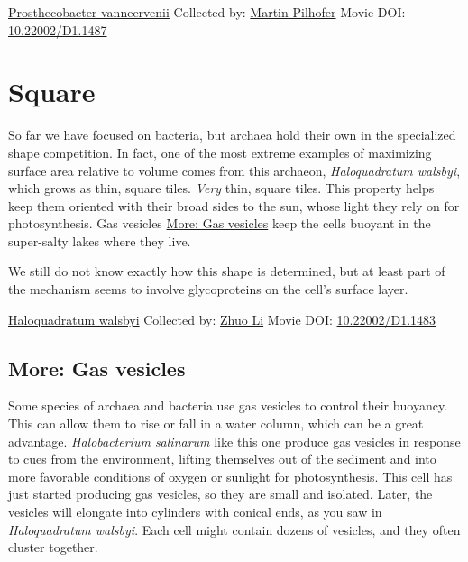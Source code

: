 \documentclass[]{tufte-book}
\begin{document}
\hypertarget{htmlwidget-46dfcbfe86e98af2c6a7}{}

\label{fig:3-6a}\protect\hyperlink{tree}{Prosthecobacter vanneervenii} Collected by: \protect\hyperlink{martin_pilhofer}{Martin Pilhofer} Movie DOI: \href{https://doi.org/10.22002/D1.1487}{10.22002/D1.1487}

\hypertarget{square}{%
\section{Square}\label{square}}

So far we have focused on bacteria, but archaea hold their own in the specialized shape competition. In fact, one of the most extreme examples of maximizing surface area relative to volume comes from this archaeon, \emph{Haloquadratum walsbyi}, which grows as thin, square tiles. \emph{Very} thin, square tiles. This property helps keep them oriented with their broad sides to the sun, whose light they rely on for photosynthesis. Gas vesicles \protect\hyperlink{Gas_vesicles}{More: Gas vesicles} keep the cells buoyant in the super-salty lakes where they live.

We still do not know exactly how this shape is determined, but at least part of the mechanism seems to involve glycoproteins on the cell's surface layer.



\hypertarget{htmlwidget-8676f1e8adf701c0fca1}{}

\label{fig:3-7}\protect\hyperlink{tree}{Haloquadratum walsbyi} Collected by: \protect\hyperlink{zhuo_li}{Zhuo Li} Movie DOI: \href{https://doi.org/10.22002/D1.1483}{10.22002/D1.1483}

\hypertarget{Gas_vesicles}{%
\subsection*{More: Gas vesicles}\label{Gas_vesicles}}

Some species of archaea and bacteria use gas vesicles to control their buoyancy. This can allow them to rise or fall in a water column, which can be a great advantage. \emph{Halobacterium salinarum} like this one produce gas vesicles in response to cues from the environment, lifting themselves out of the sediment and into more favorable conditions of oxygen or sunlight for photosynthesis. This cell has just started producing gas vesicles, so they are small and isolated. Later, the vesicles will elongate into cylinders with conical ends, as you saw in \emph{Haloquadratum walsbyi}. Each cell might contain dozens of vesicles, and they often cluster together.
\end{document}
